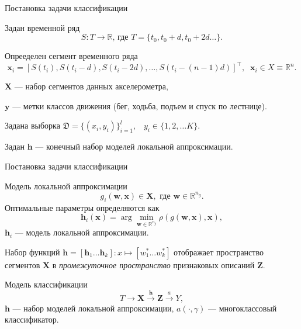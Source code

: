 \documentclass{beamer}
\newcommand{\bx}{\mathbf{x}}
\newcommand{\by}{\mathbf{y}}
\newcommand{\bw}{\mathbf{w}}
\newcommand{\bX}{\mathbf{X}}
\newcommand{\bh}{\mathbf{h}}
\newcommand{\bZ}{\mathbf{Z}}
\newcommand{\brs}[1]{\left(#1\right)}
\newcommand{\R}{\mathbb{R}}
\begin{document}



\begin{frame}{Постановка задачи классификации}
    \begin{block}{Задан временной ряд}
    $$
    S: T \to \R \text{, где } T = \{t_0, t_0 + d, t_0 + 2d \ldots\}.
    $$
    \end{block}
    \begin{block}{Опрееделен сегмент временного ряда}%
    $$
    \bx_i  = [S(t_i), S(t_i - d), S(t_i - 2d), \ldots, S(t_i - (n - 1)d)]^\intercal,
\;\; \bx_i \in X \equiv \R^n.
    $$
    \end{block}
        $\bX$ — набор сегментов данных акселерометра,

        $\by$ — метки классов движения (бег, ходьба, подъем и спуск по лестнице).

        Задана выборка $\mathfrak{D} = \{ (x_i, y_i) \}_{i=1}^l, \;\;\; y_i \in \{1, 2, \ldots K\}$.

        Задан $\bh$ — конечный набор моделей локальной аппроксимации.

\end{frame}



\begin{frame}{Постановка задачи классификации}
    \begin{block}{Модель локальной аппроксимации}
        $$
        g_i(\bw, \bx) \in \bX, \text{ где }\bw \in \R^{n_g}.
        $$
        Оптимальные параметры определяются как
        $$
        \bh_i(\bx) = \arg\min_{\bw \in \R^{n_g}} \rho\brs{g(\bw, \bx), \bx},
        $$
        $\bh_i$ — модель локальной аппроксимации.
    \end{block}

    Набор функций $\bh = [\bh_1\ldots \bh_k]: x \mapsto [w_1^* \ldots w_k^*]$
    отображает пространство сегментов $\bX$ в
    \textit{промежуточное пространство} признаковых описаний $\bZ$.
    \begin{block}{Модель классификации}
        $$
        T \rightarrow \bX \xrightarrow{\bh} \bZ \xrightarrow{a} Y,
        $$
        $\bh$ — набор моделей локальной аппроксимации, $a(\cdot, \gamma)$ —
        многоклассовый классификатор.
    \end{block}
\end{frame}
\end{document}
